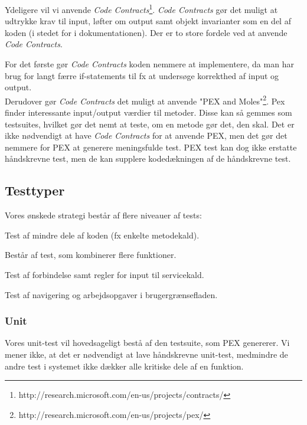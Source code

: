 Ydeligere vil vi anvende \textit{Code Contracts}\footnote{http://research.microsoft.com/en-us/projects/contracts/}. \textit{Code Contracts} gør det muligt at udtrykke krav til input, løfter om output samt objekt invarianter som en del af koden (i stedet for i dokumentationen). Der er to store fordele ved at anvende \textit{Code Contracts}. 

For det første gør \textit{Code Contracts} koden nemmere at implementere, da man har brug for langt færre if-statements til fx at undersøge korrekthed af input og output.
\\Derudover gør \textit{Code Contracts} det muligt at anvende "PEX and Moles"\footnote{http://research.microsoft.com/en-us/projects/pex/}. Pex finder interessante input/output værdier til metoder. Disse kan så gemmes som testsuites, hvilket gør det nemt at teste, om en metode gør det, den skal. Det er ikke nødvendigt at have \textit{Code Contracts} for at anvende PEX, men det gør det nemmere for PEX at generere meningsfulde test. PEX test kan dog ikke erstatte håndskrevne test, men de kan supplere kodedækningen af de håndskrevne test.

\subsection{Testtyper}
\label{Test_intendedStrat_types}
Vores ønskede strategi består af flere niveauer af tests:
\begin{my_description}
\item[Unit] Test af mindre dele af koden (fx enkelte metodekald).
\item[Scenario] Består af test, som kombinerer flere funktioner.
\item[Service] Test af forbindelse samt regler for input til servicekald.
\item[Brugergrænseflade] Test af navigering og arbejdsopgaver i brugergrænsefladen.
\end{my_description}

\subsubsection{Unit}
\label{Test_intendedStrat_types_unit}
Vores unit-test vil hovedsageligt bestå af den testsuite, som PEX genererer. Vi mener ikke, at det er nødvendigt at lave håndskrevne unit-test, medmindre de andre test i systemet ikke dækker alle kritiske dele af en funktion.

